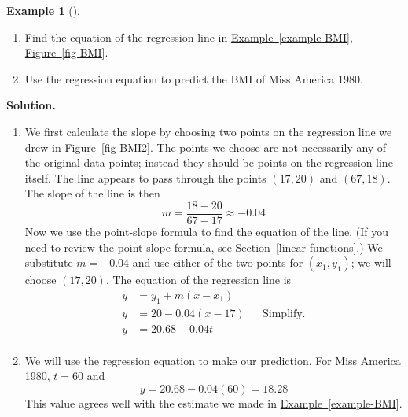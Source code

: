 \documentclass[10pt,]{book}
\theoremstyle{plain}
\theoremstyle{definition}
\theoremstyle{definition}
\newtheorem{example}[theorem]{Example}
\theoremstyle{definition}
\theoremstyle{definition}
\numberwithin{equation}{part}
\newcommand{\amp}{&}
\begin{document}
\begin{example}[]\label{example-BMI-regression}
\leavevmode%
\begin{enumerate}[label=*\alph**]
\item\hypertarget{li-1311}{}Find the equation of the regression line in \hyperref[example-BMI]{Example~\ref{example-BMI}}, \hyperref[fig-BMI]{Figure~\ref{fig-BMI}}.%
\item\hypertarget{li-1312}{}Use the regression equation to predict the BMI of Miss America 1980.%
\end{enumerate}
%
\par\medskip\noindent%
\textbf{Solution.}\quad \leavevmode%
\begin{enumerate}[label=*\alph**]
\item\hypertarget{li-1313}{}We first calculate the slope by choosing two points on the regression line we drew in \hyperref[fig-BMI2]{Figure~\ref{fig-BMI2}}. The points we choose are not necessarily any of the original data points; instead they should be points on the regression line itself. The line appears to pass through the points \((17, 20)\) and \((67, 18)\). The slope of the line is then%
\begin{equation*}
m = \frac{18 - 20}{67 - 17}\approx -0.04
\end{equation*}
Now we use the point-slope formula to find the equation of the line. (If you need to review the point-slope formula, see \hyperref[linear-functions]{Section~\ref{linear-functions}}.) We substitute \(m = -0.04\) and use either of the two points for \((x_1, y_1)\); we will choose \((17, 20)\). The equation of the regression line is \begin{align*} y \amp = y_1 + m(x - x_1)\\ y \amp = 20-0.04(x-17) \amp \amp \text{Simplify.}\\ y \amp = 20.68 - 0.04t\\ \end{align*}%
\item\hypertarget{li-1314}{}We will use the regression equation to make our prediction. For Miss America 1980, \(t = 60\) and%
\begin{equation*}
y = 20.68 - 0.04(60) = 18.28
\end{equation*}
This value agrees well with the estimate we made in \hyperref[example-BMI]{Example~\ref{example-BMI}}.%
\end{enumerate}
%
\end{example}
\end{document}
